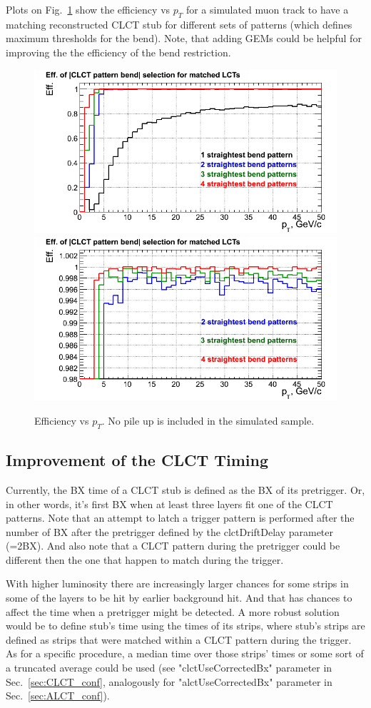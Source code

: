 Plots on Fig.~\ref{fig:efficiency_vs_pt} show the efficiency vs $p_T$ for a simulated muon track to have a matching reconstructed CLCT stub for different sets of patterns (which defines maximum thresholds for the bend). Note, that adding GEMs could be helpful for improving the the efficiency of the bend restriction.

\begin{figure}[tbh]
        \begin{center}
                \includegraphics[width=0.48\linewidth]{figures/efficiency_vs_pt.png}
                \includegraphics[width=0.48\linewidth]{figures/efficiency_vs_pt_scale.png}
                \caption{Efficiency vs $p_T$. No pile up is included in the simulated sample.}
                \label{fig:efficiency_vs_pt}
        \end{center}
\end{figure}

\subsection{Improvement of the CLCT Timing}

Currently, the BX time of a CLCT stub is defined as the BX of its pretrigger. Or, in other words, it's first BX when at least three layers fit one of the CLCT patterns. Note that an attempt to latch a trigger pattern is performed after the number of BX after the pretrigger defined by the clctDriftDelay parameter (=2BX). And also note that a CLCT pattern during the pretrigger could be different then the one that happen to match during the trigger.

With higher luminosity there are increasingly larger chances for some strips in some of the layers to be hit by earlier background hit. And that has chances to affect the time when a pretrigger might be detected. A more robust solution would be to define stub's time using the times of its strips, where stub's strips are defined as strips that were matched within a CLCT pattern during the trigger. As for a specific procedure, a median time over those strips' times or some sort of a truncated average could be used (see "clctUseCorrectedBx" parameter in Sec.~\ref{sec:CLCT_conf}, analogously for "alctUseCorrectedBx" parameter in Sec.~\ref{sec:ALCT_conf}).

